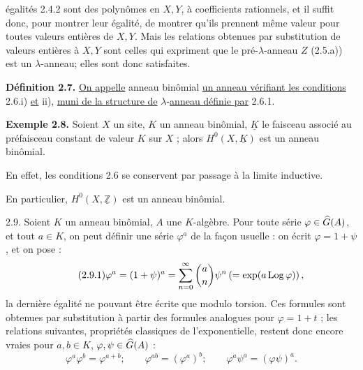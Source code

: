 
égalités 2.4.2 sont des polynômes en \(X,Y\), à coefficients rationnels, et il suffit donc, pour montrer leur égalité, de montrer qu'ils prennent même valeur pour toutes valeurs entières de \(X,Y\). Mais les relations obtenues par substitution de valeurs entières à \(X,Y\) sont celles qui expriment que le pré-\(\lambda\)-anneau \(Z\) (2.5.a)) est un \(\lambda\)-anneau; elles sont donc satisfaites.

\textbf{Définition 2.7.} \uline{On appelle} anneau binômial \uline{un anneau vérifiant les conditions} 2.6.i) \uline{et} ii), \uline{muni de la structure de} \(\lambda\)-\uline{anneau définie par} 2.6.1.

\textbf{Exemple 2.8.} Soient \(X\) un site, \(K\) un anneau binômial, \(\underline{K}\) le faisceau associé au préfaisceau constant de valeur \(K\) sur \(X\) ; alors \(H^0(X,\underline{K})\) est un anneau binômial.

En effet, les conditions 2.6 se conservent par passage à la limite inductive.

En particulier, \(H^0(X,\underline{\mathbb Z})\) est un anneau binômial.

2.9. Soient \(K\) un anneau binômial, \(A\) une \(K\)-algèbre. Pour toute série \(\varphi\in\Ghat(A)\), et tout \(a\in K\), on peut définir une série \(\varphi^a\) de la façon usuelle : on écrit \(\varphi=1+\psi\), et on pose :
\begin{equation}\tag{2.9.1}
  \varphi^a=(1+\psi)^a
  =
  \sum_{n=0}^{\infty}\binom{a}{n}\psi^n
  \left(=\exp(a\Log\varphi)\right),
\end{equation}
la dernière égalité ne pouvant être écrite que modulo torsion. Ces formules sont obtenues par substitution à partir des formules analogues pour \(\varphi=1+t\) ; les relations suivantes, propriétés classiques de l'exponentielle, restent donc encore vraies pour \(a,b\in K\), \(\varphi,\psi\in\Ghat(A)\) :
\begin{equation}\tag{2.9.2}
  \varphi^a\varphi^b=\varphi^{a+b};\qquad
  \varphi^{ab}=(\varphi^a)^b;\qquad
  \varphi^a\psi^a=(\varphi\psi)^a .
\end{equation}



\providecommand{\Ghat}{\widehat G}
\providecommand{\Gg}{\widehat G_g}
\providecommand{\Gcirc}{\widehat G_{\circ}}
\providecommand{\Gnabla}{\widehat G_{\nabla}}
\providecommand{\Grhat}{\widehat{\operatorname{Gr}}}
\providecommand{\Log}{\operatorname{Log}}
\providecommand{\Fil}{\operatorname{Fil}}
\providecommand{\eps}{\varepsilon}
\renewcommand{\id}{\operatorname{id}}
\providecommand{\Sym}{\operatorname{Sym}}
\providecommand{\Mon}{\operatorname{Mon}}


